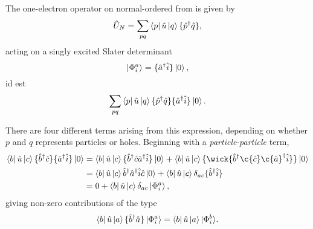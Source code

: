     The one-electron operator on normal-ordered from is given by
	\begin{equation}
		\hat{U}_N = \sum_{pq} \bra{p} \hat{u} \ket{q} \{\hat{p}^\dagger \hat{q} \},
	\end{equation}
	acting on a singly excited Slater determinant
	\begin{equation}
		\ket{\Phi^a_i} = \{ \hat{a}^\dagger \hat{i} \}\ket{0},
	\end{equation}
	id est
	\begin{equation}
		\sum_{pq} \bra{p} \hat{u} \ket{q} \{\hat{p}^\dagger \hat{q} \}\{ \hat{a}^\dagger \hat{i} \}\ket{0}.
	\end{equation}
	
	There are four different terms arising from this expression, depending on whether $p$ and $q$
	represents particles or holes. Beginning with a \emph{particle}-\emph{particle} term,
	\begin{equation}
		\begin{aligned}
			\bra{b} \hat{u} \ket{c} \{ \hat{b}^\dagger \hat{c} \} \{ \hat{a}^\dagger \hat{i} \} \ket{0} 
				&= \bra{b} \hat{u} \ket{c} \{ \hat{b}^\dagger \hat{c} \hat{a}^\dagger \hat{i} \} \ket{0}
				+	   \bra{b} \hat{u} \ket{c} \{\wick{  \hat{b}^\dagger  \c{\hat{c}}  \c{\hat{a}}^\dagger \hat{i} } \} \ket{0}\\
				&= \bra{b} \hat{u} \ket{c} \hat{b}^\dagger\hat{a}^\dagger\hat{i}\hat{c}\ket{0}
				+	  \bra{b} \hat{u} \ket{c} \delta_{ac}\{\hat{b}^\dagger \hat{i} \} \\
				&= 0 + \bra{b} \hat{u} \ket{c} \delta_{ac}\ket{\Phi_i^a},
		\end{aligned}
	\end{equation}
	giving non-zero contributions of the type
	\begin{equation}
		\bra{b} \hat{u} \ket{a} \{ \hat{b}^\dagger \hat{a} \} \ket{\Phi_i^a} 
			= \bra{b} \hat{u} \ket{a} \lvert \Phi_i^b \rangle.
	\end{equation}
	
